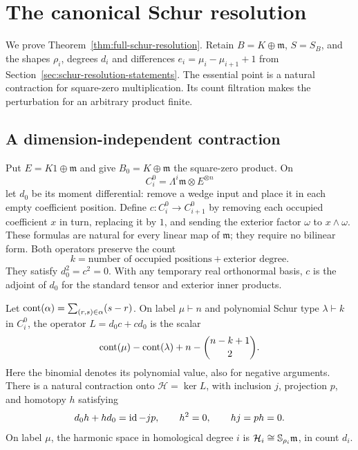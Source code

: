 \section{The canonical Schur resolution}
\label{app:schur-resolution}

We prove Theorem~\ref{thm:full-schur-resolution}. Retain
$B=K\oplus\mathfrak m$, $S=S_B$, and the shapes $\rho_i$, degrees $d_i$
and differences $e_i=\mu_i-\mu_{i+1}+1$ from
Section~\ref{sec:schur-resolution-statements}. The essential point is a
natural contraction for square-zero multiplication. Its count filtration
makes the perturbation for an arbitrary product finite.

\subsection{A dimension-independent contraction}

Put $E=K1\oplus\mathfrak m$ and give
$B_0=K\oplus\mathfrak m$ the square-zero product. On
\[
                        C_i^0=\Lambda^i\mathfrak m\otimes E^{\otimes n}
\]
let $d_0$ be its moment differential: remove a wedge input and place
it in each empty coefficient position. Define $c:C_i^0\to C_{i+1}^0$
by removing each occupied coefficient $x$ in turn, replacing it by
$1$, and sending the exterior factor $\omega$ to $x\wedge\omega$.
These formulas are natural for every linear map of $\mathfrak m$;
they require no bilinear form. Both operators preserve the count
\[
           k=\text{number of occupied positions}+\text{exterior degree}.
\]
They satisfy $d_0^2=c^2=0$. With any temporary real orthonormal basis,
$c$ is the adjoint of $d_0$ for the standard tensor and exterior
inner products.

\begin{lemma}
\label{lem:schur-content-laplacian}
Let $\operatorname{cont}(\alpha)=\sum_{(r,s)\in\alpha}(s-r)$. On label
$\mu\vdash n$ and polynomial Schur type $\lambda\vdash k$ in $C_i^0$,
the operator $L=d_0c+cd_0$ is the scalar
\begin{equation}\label{eq:schur-content-laplacian}
           \operatorname{cont}(\mu)-\operatorname{cont}(\lambda)+n-\binom{n-k+1}{2}.
\end{equation}
Here the binomial denotes its polynomial value, also for negative
arguments. There is a natural contraction onto $\mathcal H=\ker L$,
with inclusion $j$, projection $p$, and homotopy $h$ satisfying
\[
 d_0h+hd_0=\operatorname{id}-jp,\qquad h^2=0,\qquad hj=ph=0.
\]
On label $\mu$, the harmonic space in homological degree $i$ is
$\mathcal H_i\cong\mathbb S_{\rho_i}\mathfrak m$, in count $d_i$.
\end{lemma}

